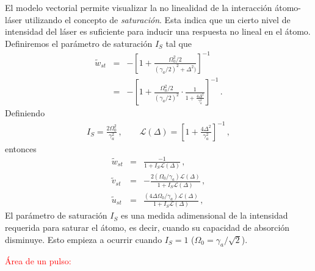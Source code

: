 \documentclass[12pt]{report}
\newcommand{\mcL}{\mathcal{L}}
\begin{document}
El modelo vectorial permite visualizar la no linealidad de la interacci\'on  
\'atomo-l\'aser utilizando el concepto de \textit{saturaci\'on}. Esta indica 
que un cierto nivel de intensidad del l\'aser es suficiente para inducir 
una respuesta no lineal en el \'atomo. Definiremos el par\'ametro de 
saturaci\'on $I_S$ tal que 
%
\begin{eqnarray*}
\tilde{w}_{st} &=& - \left[ 1 + 
	\frac{\Omega_0^2 /2}{(\gamma_a/2)^2 +\Delta^2)} \right]^{-1} \\ 
&=& - \left[ 1 + 
	\frac{\Omega_0^2 /2}{(\gamma_a/2)^2} \cdot 
	\frac{1}{1+ \frac{4\Delta^2}{\gamma_a^2}} \right]^{-1} \,.
\end{eqnarray*}
Definiendo  
%
\begin{eqnarray}
I_S = \frac{2\Omega_0^2}{\gamma_a^2} \,, 	\qquad 
\mcL (\Delta) = \left[ 1+ \frac{4\Delta^2}{\gamma_a^2} \right]^{-1} \,, 
\end{eqnarray}
entonces 
%
\begin{subequations}
\begin{eqnarray}
\tilde{w}_{st} &=& \frac{-1}{ 1+ I_S \mcL(\Delta) } \,,  \\ 
\tilde{v}_{st} &=& -\frac{ 2(\Omega_0/\gamma_a) \mcL(\Delta)} 
	{1+ I_S \mcL(\Delta) } \,, \\
\tilde{u}_{st} &=& \frac{ (4\Delta \Omega_0 /\gamma_a) \mcL(\Delta) }
	{1+ I_S \mcL(\Delta) } \,, 
\end{eqnarray}
\end{subequations}
El par\'ametro de saturaci\'on $I_S$ es una medida adimensional de la 
intensidad requerida para saturar el \'atomo, es decir, cuando su capacidad 
de absorci\'on disminuye. Esto empieza a ocurrir cuando $I_S =1$ 
($\Omega_0 = \gamma_a/\sqrt{2}$).

\textcolor{red}{\'Area de un pulso:} 

\end{document}
